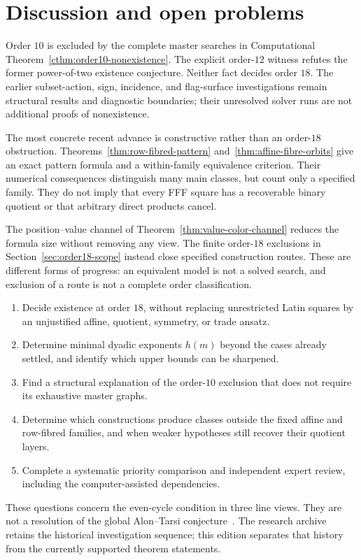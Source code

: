 \section{Discussion and open problems}

Order $10$ is excluded by the complete master searches in
Computational Theorem~\ref{cthm:order10-nonexistence}. The explicit
order-$12$ witness refutes the former power-of-two existence conjecture.
Neither fact decides order $18$. The earlier subset-action, sign,
incidence, and flag-surface investigations remain structural results
and diagnostic boundaries; their unresolved solver runs are not
additional proofs of nonexistence.

The most concrete recent advance is constructive rather than an
order-$18$ obstruction. Theorems~\ref{thm:row-fibred-pattern}
and~\ref{thm:affine-fibre-orbits} give an exact pattern formula and
a within-family equivalence criterion. Their numerical consequences
distinguish many main classes, but count only a specified family.
They do not imply that every FFF square has a recoverable binary
quotient or that arbitrary direct products cancel.

The position--value channel of Theorem~\ref{thm:value-color-channel}
reduces the formula size without removing any view. The finite
order-$18$ exclusions in Section~\ref{sec:order18-scope} instead close
specified construction routes. These are different forms of
progress: an equivalent model is not a solved search, and exclusion
of a route is not a complete order classification.

\begin{enumerate}
\item Decide existence at order $18$, without replacing unrestricted
Latin squares by an unjustified affine, quotient, symmetry, or trade ansatz.
\item Determine minimal dyadic exponents $h(m)$ beyond the cases
already settled, and identify which upper bounds can be sharpened.
\item Find a structural explanation of the order-$10$ exclusion
that does not require its exhaustive master graphs.
\item Determine which constructions produce classes outside the
fixed affine and row-fibred families, and when weaker hypotheses
still recover their quotient layers.
\item Complete a systematic priority comparison and independent
expert review, including the computer-assisted dependencies.
\end{enumerate}

These questions concern the even-cycle condition in three line views.
They are not a resolution of the global Alon--Tarsi
conjecture~\cite{AlonTarsi1992}. The research archive retains the
historical investigation sequence; this edition separates that history
from the currently supported theorem statements.
